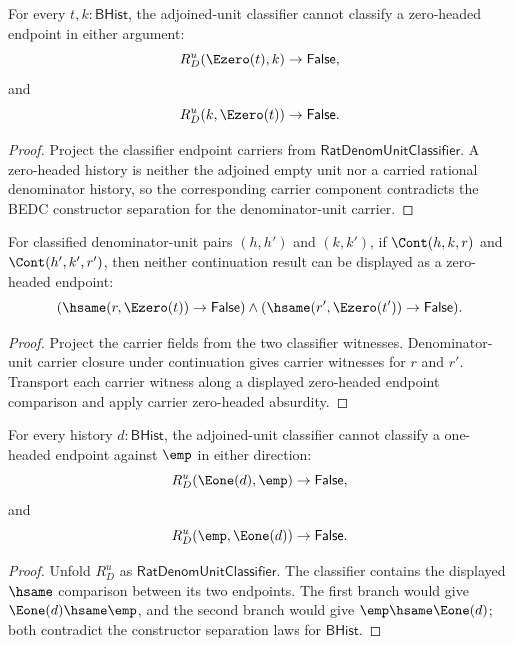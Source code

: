 \begin{theorem}
\label{thm:rat-denom-unit-classifier-e0-endpoint-absurd}
For every $t,k:\mathsf{BHist}$, the adjoined-unit classifier cannot classify
a zero-headed endpoint in either argument:
$$
R_D^u(\Ezero(t),k)\to\mathsf{False},
$$
and
$$
R_D^u(k,\Ezero(t))\to\mathsf{False}.
$$
\end{theorem}
\begin{proof}
Project the classifier endpoint carriers from
$\mathsf{RatDenomUnitClassifier}$. A zero-headed history is neither the
adjoined empty unit nor a carried rational denominator history, so the
corresponding carrier component contradicts the BEDC constructor separation
for the denominator-unit carrier.
\end{proof}

\begin{theorem}
\label{thm:rat-denom-unit-classifier-continuation-e0-endpoint-absurd}
For classified denominator-unit pairs $(h,h')$ and $(k,k')$, if
$\Cont(h,k,r)$ and $\Cont(h',k',r')$, then neither continuation result can be
displayed as a zero-headed endpoint:
$$
(\hsame(r,\Ezero(t))\to\mathsf{False})\land
(\hsame(r',\Ezero(t'))\to\mathsf{False}).
$$
\end{theorem}
\begin{proof}
Project the carrier fields from the two classifier witnesses. Denominator-unit
carrier closure under continuation gives carrier witnesses for $r$ and $r'$.
Transport each carrier witness along a displayed zero-headed endpoint
comparison and apply carrier zero-headed absurdity.
\end{proof}

\begin{theorem}
\label{thm:rat-denom-unit-classifier-e1-empty-absurd}
For every history $d:\mathsf{BHist}$, the adjoined-unit classifier cannot
classify a one-headed endpoint against $\emp$ in either direction:
$$
R_D^u(\Eone(d),\emp)\to\mathsf{False},
$$
and
$$
R_D^u(\emp,\Eone(d))\to\mathsf{False}.
$$
\end{theorem}
\begin{proof}
Unfold $R_D^u$ as $\mathsf{RatDenomUnitClassifier}$. The classifier contains
the displayed $\hsame$ comparison between its two endpoints. The first branch
would give $\Eone(d)\hsame\emp$, and the second branch would give
$\emp\hsame\Eone(d)$; both contradict the constructor separation laws for
$\mathsf{BHist}$.
\end{proof}

